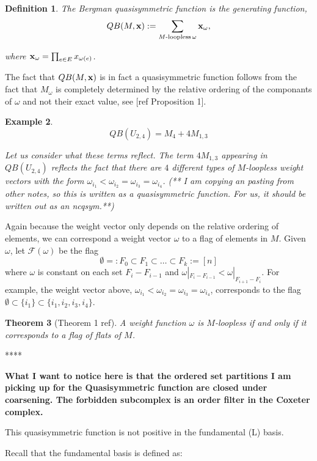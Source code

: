 \documentclass[12pt]{amsart}
\newtheorem{definition}{Definition}
\newtheorem{theorem}[definition]{Theorem}
\newtheorem{example}[definition]{Example}
\newcommand{\om}{\omega}
\begin{document}
\begin{definition}
The Bergman quasisymmetric function is the generating function,
$$QB(M,{\bf x}) := \sum_{M\textrm{-loopless} \, \omega} {\bf x}_{\omega},$$

where ${\bf x}_{\omega} = \prod_{e \in E} x_{\omega(e)}$.
\end{definition}

The fact that $QB(M,{\bf x})$ is in fact a quasisymmetric function follows
from the fact that $M_{\omega}$ is completely determined by the
relative ordering of the componants of $\omega$ and not their exact
value, see [ref Proposition 1].

\begin{example}
$$QB(U_{2,4})  = M_4 + 4M_{1,3}$$

Let us consider what these terms reflect.  The term $4M_{1,3}$
appearing in $QB(U_{2,4})$ reflects the fact that there are $4$
different types of $M$-loopless weight vectors with the form
$\omega_{i_1} < \omega_{i_2} = \omega_{i_3} = \omega_{i_4}$.
(** I am copying an pasting from other notes, so this is written as a quasisymmetric function.  For us, it should be written out as an ncqsym.**)
\end{example}


Again because the weight vector only depends on the relative ordering
of elements, we can correspond a weight vector $\om$ to a flag of
elements in $M$.  Given $\om$, let $\mathcal{F}(\om)$ be the flag 
$$\emptyset =: F_0 \subset F_1 \subset \ldots \subset F_k := [n]$$
where $\om$ is constant on each set $F_i - F_{i-1}$ and $\om|_{F_i - F_{i-1}} < \om|_{F_{i+1} - F_{i}} $.  For example, the weight vector above,  $\om_{i_1} < \om_{i_2} = \om_{i_3} = \om_{i_4}$, corresponds to the flag ${\emptyset \subset \{i_1\} \subset \{i_1,i_2,i_3,i_4\}}$.

\begin{theorem}[Theorem 1 ref]
A weight function $\omega$ is $M$-loopless if and only if it corresponds 
to a flag of flats of $M$.
\end{theorem}


**** {\bf What I want to notice here is that the ordered set partitions I
am picking up for the Quasisymmetric function are closed under
coarsening.  The forbidden subcomplex is an order filter in the
Coxeter complex.  

This quasisymmetric function is not positive in the fundamental (L) basis.  }

Recall that the fundamental basis is defined as:
\end{document}
